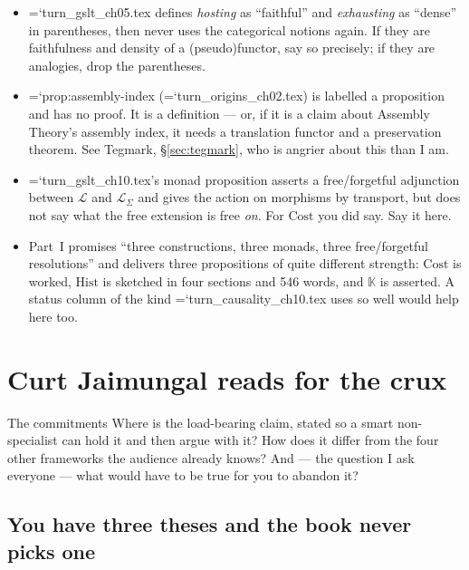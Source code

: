 \documentclass[11pt,letterpaper]{article}
\newcommand{\loc}[1]{{\small\ttfamily\color{accent}\hyphenchar\font=`\-\relax #1}}
\begin{document}
\begin{itemize}[leftmargin=1.2em,itemsep=3pt]
\item \loc{turn\_gslt\_ch05.tex} defines \emph{hosting} as ``faithful''
      and \emph{exhausting} as ``dense'' in parentheses, then never
      uses the categorical notions again. If they are faithfulness and
      density of a (pseudo)functor, say so precisely; if they are
      analogies, drop the parentheses.
\item \loc{prop:assembly-index} (\loc{turn\_origins\_ch02.tex}) is
      labelled a proposition and has no proof. It is a definition ---
      or, if it is a claim about Assembly Theory's assembly index, it
      needs a translation functor and a preservation theorem. See
      Tegmark, \S\ref{sec:tegmark}, who is angrier about this than I am.
\item \loc{turn\_gslt\_ch10.tex}'s monad proposition asserts a
      free/forgetful adjunction between $\mathcal{L}$ and
      $\mathcal{L}_\Sigma$ and gives the action on morphisms by
      transport, but does not say what the free extension is free
      \emph{on}. For $\mathrm{Cost}$ you did say. Say it here.
\item Part~I promises ``three constructions, three monads, three
      free/forgetful resolutions'' and delivers three propositions of
      quite different strength: $\mathrm{Cost}$ is worked,
      $\mathrm{Hist}$ is sketched in four sections and 546 words, and
      $\mathbb{K}$ is asserted. A status column of the kind
      \loc{turn\_causality\_ch10.tex} uses so well would help here too.
\end{itemize}

\section{Curt Jaimungal reads for the crux}

\begin{voice}{The commitments}
Where is the load-bearing claim, stated so a smart non-specialist can
hold it and then argue with it? How does it differ from the four other
frameworks the audience already knows? And --- the question I ask
everyone --- what would have to be true for you to abandon it?
\end{voice}

\subsection*{You have three theses and the book never picks one}
\end{document}
